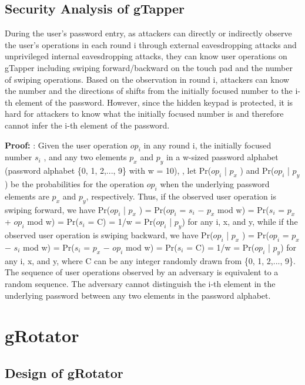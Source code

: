 \documentclass[12pt,a4paper,oneside]{report}
\begin{document}
\subsection{Security Analysis of gTapper}

During the user’s password
entry, as attackers can directly or indirectly observe the user’s
operations in each round i through external eavesdropping
attacks and unprivileged internal eavesdropping attacks, they
can know user operations on gTapper including swiping forward/backward on the touch pad and the number of swiping
operations. Based on the observation in round i, attackers can
know the number and the directions of shifts from the initially
focused number to the i-th element of the password. However,
since the hidden keypad is protected, it is hard for attackers
to know what the initially focused number is and therefore
cannot infer the i-th element of the password.

\par 
\textbf{Proof:} : Given the user operation $op_i$ in any round i, the initially focused number $s_i$ , and any two elements $p_x$ and $p_y$ in a
w-sized password alphabet (password alphabet \{0, 1, 2,..., 9\}
with w = 10), , let Pr($op_i$ | $p_x$ ) and Pr($op_i$ | $p_y$) be the probabilities for the operation $op_i$ when the underlying password
elements are $p_x$ and $p_y$, respectively. Thus, if the observed
user operation is swiping forward, we have Pr($op_i$ | $p_x$ ) =
Pr($op_i$ = $s_i$ − $p_x$ mod w) = Pr($s_i$ = $p_x$ + $op_i$ mod w) =
Pr($s_i$ = C) = 1/w = Pr($op_i$ | $p_y$) for any i, x, and y, while
if the observed user operation is swiping backward, we have
Pr($op_i$ | $p_x$ ) = Pr($op_i$ = $p_x$ − $s_i$ mod w) = Pr($s_i$ =
$p_x$ − $op_i$ mod w) = Pr($s_i$ = C) = 1/w = Pr($op_i$ | $p_y$)
for any i, x, and y, where C can be any integer randomly
drawn from \{0, 1, 2,..., 9\}. The sequence of user operations
observed by an adversary is equivalent to a random sequence.
The adversary cannot distinguish the i-th element in the underlying password between any two elements in the password
alphabet. \newpage

\section{gRotator}
\subsection{Design of gRotator}
\end{document}
